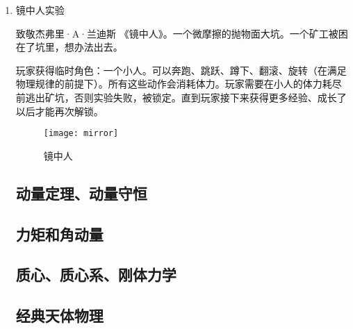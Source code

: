 \documentclass{tstextbook}
\begin{document}
\begin{enumerate}

\item{镜中人实验}

致敬杰弗里·A·兰迪斯 《镜中人》。一个微摩擦的抛物面大坑。一个矿工被困在了坑里，想办法出去。

玩家获得临时角色：一个小人。可以奔跑、跳跃、蹲下、翻滚、旋转（在满足物理规律的前提下）。所有这些动作会消耗体力。玩家需要在小人的体力耗尽前逃出矿坑，否则实验失败，被锁定。直到玩家接下来获得更多经验、成长了以后才能再次解锁。

\begin{figure}[H]
\centering 
\texttt{[image: mirror]} 
\caption{镜中人} 
\label{mirror} 
\end{figure}

\subsection{动量定理、动量守恒}

\subsection{力矩和角动量}

\subsection{质心、质心系、刚体力学}

\subsection{经典天体物理}



\end{enumerate}


\printbibliography{}


\printindex
\end{document}
